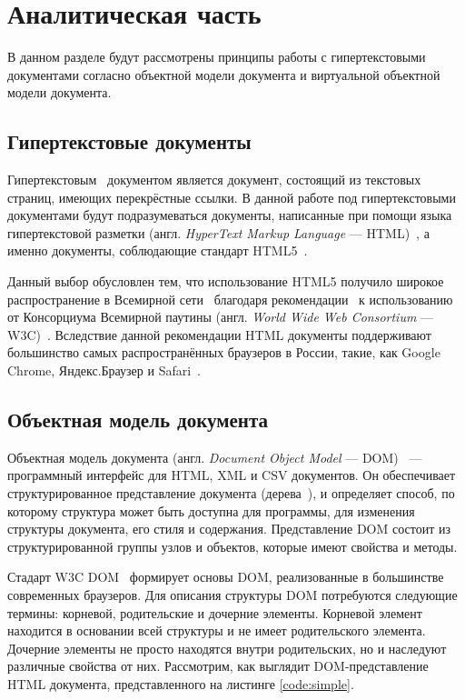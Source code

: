\section{Аналитическая часть} \label{analysis}

В данном разделе будут рассмотрены принципы работы с гипертекстовыми документами согласно объектной модели документа и виртуальной объектной модели документа.

\subsection{Гипертекстовые документы}

Гипертекстовым~\cite{hypertext} документом является документ, состоящий из текстовых страниц, имеющих перекрёстные ссылки.
В данной работе под гипертекстовыми документами будут подразумеваться документы, написанные при помощи языка гипертекстовой разметки (англ. \textit{HyperText Markup Language} --- HTML)~\cite{html}, а именно документы, соблюдающие стандарт HTML5~\cite{html-doc}.


Данный выбор обусловлен тем, что использование HTML5 получило широкое распространение в Всемирной сети~\cite{internet} благодаря рекомендации~\cite{html-recommendation} к использованию от Консорциума Всемирной паутины (англ. \textit{World Wide Web \newline Consortium} --- W3C)~\cite{w3c}.
Вследствие данной рекомендации HTML документы поддерживают большинство самых распространённых браузеров в России, такие, как Google Chrome, Яндекс.Браузер и Safari~\cite{browser-popularity-russia}.

\subsection{Объектная модель документа}

Объектная модель документа (англ. \textit{Document Object Model} --- DOM)~\cite{dom} --- программный интерфейс для HTML, XML и CSV документов.
Он обеспечивает структурированное представление документа (дерева~\cite{balanced-tree}), и определяет способ, по которому структура может быть доступна для программы, для изменения структуры документа, его стиля и содержания.
Представление DOM состоит из структурированной группы узлов и объектов, которые имеют свойства и методы.

Стадарт W3C DOM~\cite{dom-doc} формирует основы DOM, реализованные в большинстве современных браузеров.
Для описания структуры DOM потребуются следующие термины: корневой, родительские и дочерние элементы.
Корневой элемент находится в основании всей структуры и не имеет родительского элемента.
Дочерние элементы не просто находятся внутри родительских, но и наследуют различные свойства от них.
Рассмотрим, как выглядит DOM-представление HTML документа, представленного на листинге \ref{code:simple}.

